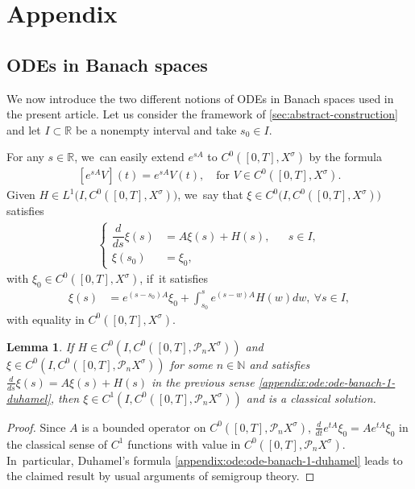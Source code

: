 \documentclass[11pt]{article}
\newtheorem{lemma}[theorem]{Lemma}
\theoremstyle{definition}
\newcommand{\R}{\mathbb{R}}
\newcommand{\N}{\mathbb{N}}
\renewcommand{\P}{\mathcal{P}}
\begin{document}
\section*{Appendix}

\subsection{ODEs in Banach spaces} We now introduce the two different notions of ODEs in Banach spaces used in the present article. Let us consider the framework of \cref{sec:abstract-construction} and let $I\subset \R$ be a nonempty interval and take $s_0\in I$.

For any $s\in \R$, we~can easily extend $e^{sA}$ to $C^{0}([0,T],X^{\sigma})$ by the formula
\begin{align*}
\left[e^{sA}V\right](t)=e^{sA}V(t),\quad \text{for $V\in C^{0}([0,T],X^{\sigma})$.}
\end{align*}
Given $H\in L^{1}\big(I,C^{0}([0,T],X^{\sigma})\big)$, we~say that $\xi\in C^{0}\big(I,C^{0}([0,T],X^{\sigma})\big)$ satisfies
\begin{align}\label{appendix:ode:ode-banach-1}
\left\{\begin{aligned}
\dfrac{d}{ds}\xi(s)&=A \xi(s)+H(s), && s\in I, \\
\xi(s_0)&=\xi_0, &&
\end{aligned}\right.
\end{align}
with $\xi_0\in C^{0}([0,T],X^{\sigma})$, if~it satisfies
\begin{align}\label{appendix:ode:ode-banach-1-duhamel}
\xi(s)&=e^{(s-s_0)A}\xi_0+\int_{s_0}^{s}e^{(s-w)A}H(w)dw,\ \forall s\in I,
\end{align}
with equality in $C^{0}([0,T],X^{\sigma})$.
\begin{lemma}
\label{lmDuhamelCauchy}
If $H\in C^0\left(I,C^{0}([0,T],\P_{n}X^{\sigma})\right)$ and $\xi\in C^{0}\left(I,C^{0}([0,T],\P_{n}X^{\sigma})\right)$ for some $n\in\N$ and satisfies
$ \frac{d}{ds}\xi(s)=A \xi(s)+H(s)$ in the previous sense \eqref{appendix:ode:ode-banach-1-duhamel}, then $\xi\in C^{1}\left(I,C^{0}([0,T],\P_{n}X^{\sigma})\right)$ and is a classical solution.
\end{lemma}
\begin{proof}
Since $A$ is a bounded operator on $C^{0}([0,T],\P_{n}X^{\sigma})$, $\frac{d}{dt}e^{tA}\xi_0=A e^{tA}\xi_0$ in the classical sense of $C^1$ functions with value in $C^{0}([0,T],\P_{n}X^{\sigma})$. In~particular, Duhamel's formula \eqref{appendix:ode:ode-banach-1-duhamel} leads to the claimed result by usual arguments of semigroup theory.
\end{proof}
\end{document}
